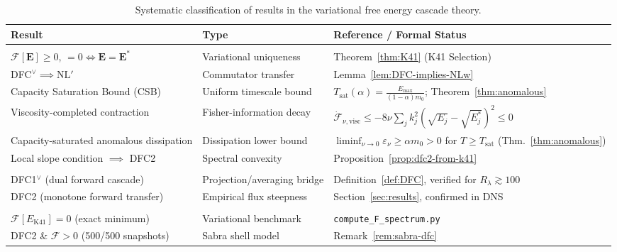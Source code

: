 \documentclass[12pt,a4paper]{article}
\theoremstyle{breakdef}
\theoremstyle{breakplain}
\theoremstyle{breakdef}
\begin{document}
\begin{table}[htbp]
\centering
\footnotesize
\caption{Systematic classification of results in the variational free energy cascade theory.}
\label{tab:result-classification}
\vspace{4pt}
\setlength{\tabcolsep}{4pt}
\renewcommand{\arraystretch}{1.15}
\begin{tabularx}{\textwidth}{>{\raggedright\arraybackslash}p{4.2cm} >{\raggedright\arraybackslash}p{3.8cm} Y}
\toprule
\textbf{Result} & \textbf{Type} & \textbf{Reference / Formal Status} \\
\midrule
{} \\
\addlinespace[2pt]
$\mathcal{F}[\mathbf{E}] \ge 0$, $= 0 \iff \mathbf{E} = \mathbf{E}^*$ & Variational uniqueness & Theorem~\ref{thm:K41} (K41 Selection) \\
DFC$^\vee \implies \mathrm{NL}'$ & Commutator transfer & Lemma~\ref{lem:DFC-implies-NLw} \\
Capacity Saturation Bound (CSB) & Uniform timescale bound & $T_{\mathrm{sat}}(\alpha) = \frac{E_{\max}}{(1-\alpha)m_0}$; Theorem~\ref{thm:anomalous} \\
Viscosity-completed contraction & Fisher-information decay & $\dot{\mathcal{F}}_{\nu,\mathrm{visc}} \le -8\nu \sum_j k_j^2 (\sqrt{E_j}-\sqrt{E_j^*})^2 \le 0$ \\
Capacity-saturated anomalous dissipation & Dissipation lower bound & $\liminf_{\nu \to 0}\varepsilon_\nu \ge \alpha m_0 > 0$ for $T \ge T_{\mathrm{sat}}$ (Thm.~\ref{thm:anomalous}) \\
Local slope condition $\implies$ DFC2 & Spectral convexity & Proposition~\ref{prop:dfc2-from-k41} \\
\addlinespace[4pt]
 \\
\addlinespace[2pt]
DFC1$^\vee$ (dual forward cascade) & Projection/averaging bridge & Definition~\ref{def:DFC}, verified for $R_\lambda \gtrsim 100$ \\
DFC2 (monotone forward transfer) & Empirical flux steepness & Section~\ref{sec:results}, confirmed in DNS \\
\addlinespace[4pt]
 \\
\addlinespace[2pt]
$\mathcal{F}[E_{\mathrm{K41}}] = 0$ (exact minimum) & Variational benchmark & \texttt{compute\_F\_spectrum.py} \\
DFC2 \& $\mathcal{F} > 0$ (500/500 snapshots) & Sabra shell model & Remark~\ref{rem:sabra-dfc} \\

\end{tabularx}
\end{table}
\end{document}
